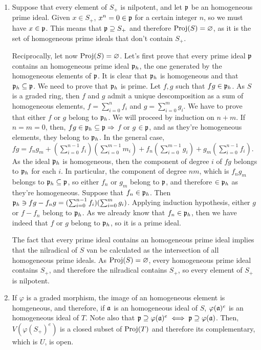 \begin{sol}
	\begin{enumerate}[label=\alph*)]
		\item Suppose that every element of $S_+$ is nilpotent, and let $\mathfrak{p}$ be an homogeneous prime ideal. Given $x \in S_+$, $x^n = 0 \in \mathfrak{p}$ for a certain integer $n$, so we must have $x \in \mathfrak{p}$. This means that $\mathfrak{p} \supseteq S_+$ and therefore $\mathrm{Proj}(S) = \varnothing$, as it is the set of homogeneous prime ideals that don't contain $S_+$. 

		Reciprocally, let now $\mathrm{Proj}(S) = \varnothing$. Let's first prove that every prime ideal $\mathfrak{p}$ contains an homogeneous prime ideal $\mathfrak{p}_h$, the one generated by the homogeneous elements of $\mathfrak{p}$. It is clear that $\mathfrak{p}_h$ is homogeneous and that $\mathfrak{p}_h \subseteq \mathfrak{p}$. We need to prove that $\mathfrak{p}_h$ is prime. Let $f,g$ such that $fg \in \mathfrak{p}_h$. As $S$ is a graded ring, then $f$ and $g$ admit a unique descomposition as a sum of homogeneous elements, $f = \sum_{i = 0}^n f_i$ and $g = \sum_{i = 0}^m g_i$. We have to prove that either $f$ or $g$ belong to $\mathfrak{p}_h$. We will proceed by induction on $n+m$. If $n = m = 0$, then, $fg \in \mathfrak{p}_h \subseteq \mathfrak{p} \Rightarrow$ $f$ or $g$ $\in \mathfrak{p}$, and as they're homogeneous elements, they belong to $\mathfrak{p}_h$. In the general case, $fg = f_n g_m + (\sum_{i = 0}^{n-1} f_i)(\sum_{i = 0}^{m-1} m_i) + f_n(\sum_{i = 0}^{m-1} g_i) + g_m(\sum_{i = 0}^{n-1} f_i)$. As the ideal $\mathfrak{p}_h$ is homogeneous, then the component of degree $i$ of $fg$ belongs to $\mathfrak{p}_h$ for each $i$. In particular, the component of degree $nm$, which is $f_n g_m$ belongs to $\mathfrak{p}_h \subseteq \mathfrak{p}$, so either $f_n$ or $g_m$ belong to $\mathfrak{p}$, and therefore $\in \mathfrak{p}_h$ as they're homogeneous. Suppose that $f_n \in \mathfrak{p}_h$. Then $\mathfrak{p}_h \ni fg - f_ng = (\sum_{i = 0}^{n-1} f_i)(\sum_{i = 0}^m g_i)$. Applying induction hypothesis, either $g$ or $f-f_n$ belong to $\mathfrak{p}_h$. As we already know that $f_n \in \mathfrak{p}_h$, then we have indeed that $f$ or $g$ belong to $\mathfrak{p}_h$, so it is a prime ideal.

		The fact that every prime ideal contains an homogeneous prime ideal implies that the nilradical of $S$ van be calculated as the intersection of all homogeneous prime ideals. As $\mathrm{Proj}(S) = \varnothing$, every homogeneous prime ideal contains $S_+$, and therefore the nilradical contains $S_+$, so every element of $S_+$ is nilpotent.

		\item If $\varphi$ is a graded morphism, the image of an homogeneous element is homgeneous, and therefore, if $\mathfrak{a}$ is an homogeneous ideal of $S$, $\varphi(\mathfrak{a})^e$ is an homogeneous ideal of $T$. Note also that $\mathfrak{p} \supseteq \varphi(\mathfrak{a})^e \iff \mathfrak{p} \supseteq \varphi(\mathfrak{a})$. Then, $V(\varphi(S_+)^e)$ is a closed subset of $\mathrm{Proj}(T)$ and therefore its complementary, which is $U$, is open.


\end{enumerate}
\end{sol}
